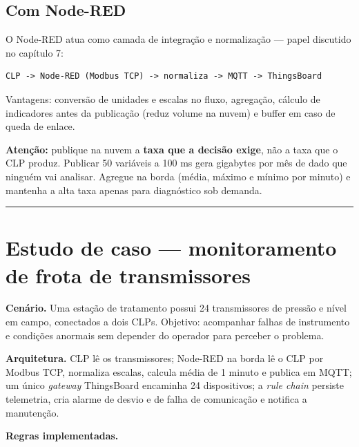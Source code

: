 \subsection{Com Node-RED}\label{com-node-red}

O Node-RED atua como camada de integração e normalização --- papel discutido no capítulo 7:

\begin{lstlisting}
CLP -> Node-RED (Modbus TCP) -> normaliza -> MQTT -> ThingsBoard
\end{lstlisting}

Vantagens: conversão de unidades e escalas no fluxo, agregação, cálculo de indicadores antes da publicação (reduz volume na nuvem) e buffer em caso de queda de enlace.

\begin{caixaatencao}

\textbf{Atenção:} publique na nuvem a \textbf{taxa que a decisão exige}, não a taxa que o CLP produz. Publicar 50 variáveis a 100 ms gera gigabytes por mês de dado que ninguém vai analisar. Agregue na borda (média, máximo e mínimo por minuto) e mantenha a alta taxa apenas para diagnóstico sob demanda.

\end{caixaatencao}

\begin{center}\rule{0.5\linewidth}{0.5pt}\end{center}

\section{\texorpdfstring{Estudo de caso --- monitoramento de frota de transmissores}{Estudo de caso  monitoramento de frota de transmissores}}\label{estudo-de-caso-monitoramento-de-frota-de-transmissores}

\textbf{Cenário.} Uma estação de tratamento possui 24 transmissores de pressão e nível em campo, conectados a dois CLPs. Objetivo: acompanhar falhas de instrumento e condições anormais sem depender do operador para perceber o problema.

\textbf{Arquitetura.} CLP lê os transmissores; Node-RED na borda lê o CLP por Modbus TCP, normaliza escalas, calcula média de 1 minuto e publica em MQTT; um único \emph{gateway} ThingsBoard encaminha 24 dispositivos; a \emph{rule chain} persiste telemetria, cria alarme de desvio e de falha de comunicação e notifica a manutenção.

\textbf{Regras implementadas.}

